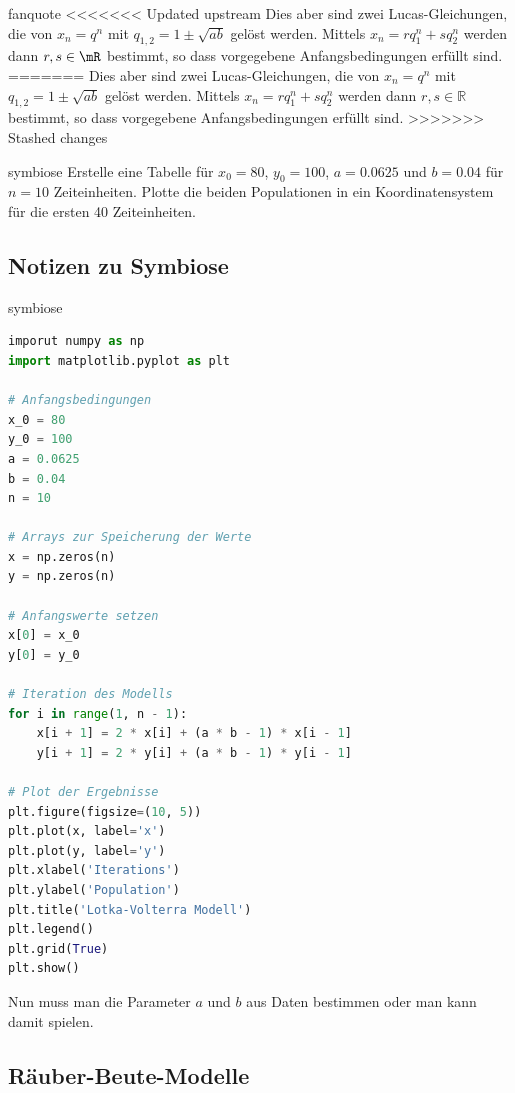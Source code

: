\documentclass[%
<<<<<<< Updated upstream
<<<<<<< Updated upstream
11pt,%
twoside,%
titlepage,%
german,%
headsepline%
]{scrartcl}
\begin{document}
\begin{uebenv}{fanquote}
<<<<<<< Updated upstream
Dies aber sind zwei Lucas-Gleichungen, die von $x_n = q^n$ mit $q_{1,2} = 1\pm\sqrt{ab}$ gelöst werden. Mittels $x_n=rq_1^n+sq_2^n$ werden dann $r,s\in\mR$ bestimmt, so dass vorgegebene Anfangsbedingungen erfüllt sind.
=======
Dies aber sind zwei Lucas-Gleichungen, die von $x_n = q^n$ mit $q_{1,2} = 1\pm\sqrt{ab}$ gelöst werden. Mittels $x_n=rq_1^n+sq_2^n$ werden dann $r,s\in\mathbb{R}$ bestimmt, so dass vorgegebene Anfangsbedingungen erfüllt sind.
>>>>>>> Stashed changes

\begin{uebenv}{symbiose}
Erstelle eine Tabelle für $x_0=80$, $y_0=100$, $a=0.0625$ und $b=0.04$ für $n=10$ Zeiteinheiten. Plotte die beiden Populationen in ein Koordinatensystem für die ersten 40 Zeiteinheiten.
\end{uebenv}

\subsection{Notizen zu Symbiose}

\begin{lsg}{symbiose}
    \begin{lstlisting}[language=python]
imporut numpy as np
import matplotlib.pyplot as plt

# Anfangsbedingungen
x_0 = 80
y_0 = 100
a = 0.0625
b = 0.04
n = 10

# Arrays zur Speicherung der Werte
x = np.zeros(n)
y = np.zeros(n)

# Anfangswerte setzen
x[0] = x_0
y[0] = y_0

# Iteration des Modells
for i in range(1, n - 1):
    x[i + 1] = 2 * x[i] + (a * b - 1) * x[i - 1]
    y[i + 1] = 2 * y[i] + (a * b - 1) * y[i - 1]

# Plot der Ergebnisse
plt.figure(figsize=(10, 5))
plt.plot(x, label='x')
plt.plot(y, label='y')
plt.xlabel('Iterations')
plt.ylabel('Population')
plt.title('Lotka-Volterra Modell')
plt.legend()
plt.grid(True)
plt.show()

    \end{lstlisting}

    Nun muss man die Parameter $a$ und $b$ aus Daten bestimmen oder man kann damit spielen.
\end{lsg}

\clearpage

\subsection{Räuber-Beute-Modelle}


\end{uebenv}
\end{document}
